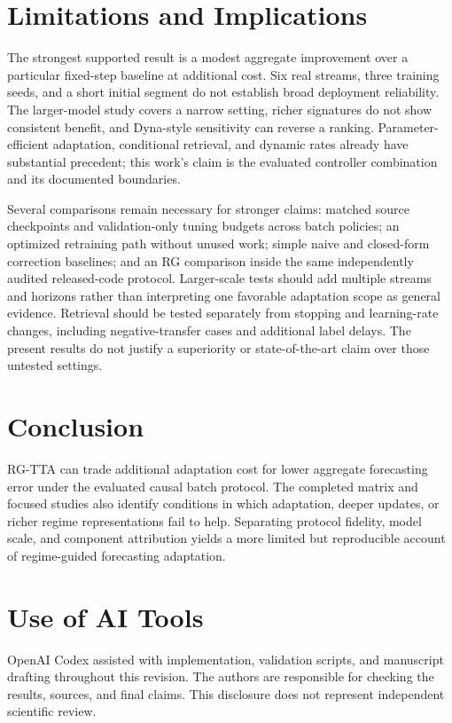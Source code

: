 \documentclass[conference]{IEEEtran}
\begin{document}
\section{Limitations and Implications}
The strongest supported result is a modest aggregate improvement over a particular fixed-step baseline at additional cost. Six real streams, three training seeds, and a short initial segment do not establish broad deployment reliability. The larger-model study covers a narrow setting, richer signatures do not show consistent benefit, and Dyna-style sensitivity can reverse a ranking. Parameter-efficient adaptation, conditional retrieval, and dynamic rates already have substantial precedent; this work's claim is the evaluated controller combination and its documented boundaries.

Several comparisons remain necessary for stronger claims: matched source checkpoints and validation-only tuning budgets across batch policies; an optimized retraining path without unused work; simple naive and closed-form correction baselines; and an RG comparison inside the same independently audited released-code protocol. Larger-scale tests should add multiple streams and horizons rather than interpreting one favorable adaptation scope as general evidence. Retrieval should be tested separately from stopping and learning-rate changes, including negative-transfer cases and additional label delays. The present results do not justify a superiority or state-of-the-art claim over those untested settings.

\section{Conclusion}
RG-TTA can trade additional adaptation cost for lower aggregate forecasting error under the evaluated causal batch protocol. The completed matrix and focused studies also identify conditions in which adaptation, deeper updates, or richer regime representations fail to help. Separating protocol fidelity, model scale, and component attribution yields a more limited but reproducible account of regime-guided forecasting adaptation.

\section*{Use of AI Tools}
OpenAI Codex assisted with implementation, validation scripts, and manuscript drafting throughout this revision. The authors are responsible for checking the results, sources, and final claims. This disclosure does not represent independent scientific review.
\end{document}
